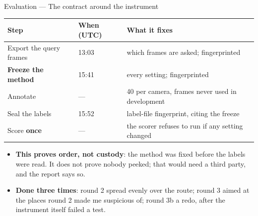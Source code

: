 \documentclass[10pt,aspectratio=169]{beamer}
\begin{document}
\begin{frame}{Evaluation --- The contract around the instrument}
\begin{center}
\begin{tabular}{lll}
\toprule
Step & When (UTC) & What it fixes \\
\midrule
Export the query frames & 13:03 & which frames are asked; fingerprinted \\
\textbf{Freeze the method} & 15:41 & every setting; fingerprinted \\
Annotate & --- & 40 per camera, frames never used in development \\
Seal the labels & 15:52 & label-file fingerprint, citing the freeze \\
Score \textbf{once} & --- & the scorer refuses to run if any setting changed \\
\bottomrule
\end{tabular}
\end{center}
\begin{itemize}
  \item \textbf{This proves order, not custody}: the method was fixed before the labels were read. It does not prove nobody peeked; that would need a third party, and the report says so.
  \item \textbf{Done three times}: round 2 spread evenly over the route; round 3 aimed at the places round 2 made me suspicious of; round 3b a redo, after the instrument itself failed a test.
\end{itemize}
\end{frame}
\end{document}
